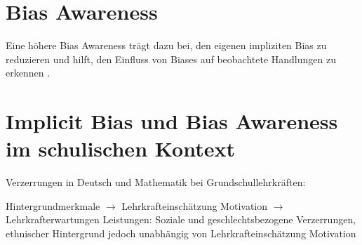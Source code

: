 \section{Bias Awareness}
\label{sec:bias-awareness}

Eine höhere Bias Awareness trägt dazu bei, den eigenen impliziten Bias zu reduzieren \citep{pope2018awareness} und hilft, den Einfluss von Biases auf beobachtete Handlungen zu erkennen \citep{perry2015modern}.


\section{Implicit Bias und Bias Awareness im schulischen Kontext}
\label{sec:biases-schule}

Verzerrungen in Deutsch und Mathematik bei Grundschullehrkräften: \cite{lorenz2016stereotype}

Hintergrundmerkmale $\rightarrow$ Lehrkrafteinschätzung Motivation $\rightarrow$ Lehrkrafterwartungen Leistungen: Soziale und geschlechtsbezogene Verzerrungen, ethnischer Hintergrund jedoch unabhängig von Lehrkrafteinschätzung Motivation \cite{gentrup2020einschatzungen}